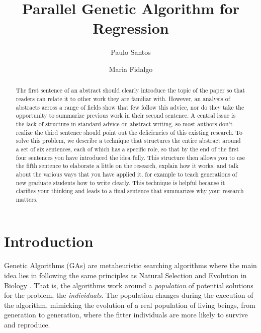 \documentclass[runningheads]{llncs}
\begin{document}
\title{Parallel Genetic Algorithm for Regression}

\author{Paulo Santos \and
Maria Fidalgo
}


\maketitle

\begin{abstract}
The first sentence of an abstract should clearly introduce the topic of the paper so that readers can relate it to other work they are familiar with. However, an analysis of abstracts across a range of fields show that few follow this advice, nor do they take the opportunity to summarize previous work in their second sentence. A central issue is the lack of structure in standard advice on abstract writing, so most authors don’t realize the third sentence should point out the deficiencies of this existing research. To solve this problem, we describe a technique that structures the entire abstract around a set of six sentences, each of which has a specific role, so that by the end of the first four sentences you have introduced the idea fully. This structure then allows you to use the fifth sentence to elaborate a little on the research, explain how it works, and talk about the various ways that you have applied it, for example to teach generations of new graduate students how to write clearly. This technique is helpful because it clarifies your thinking and leads to a final sentence that summarizes why your research matters.

\end{abstract}


\section{Introduction}

Genetic Algorithms (GAs) are metaheuristic searching algorithms where the main idea lies in following the same principles as Natural Selection and Evolution in Biology \cite{sivanandam2008genetic}. That is, the algorithms work around a \textit{population} of potential solutions for the problem, the \textit{individuals}. The population changes during the execution of the algorithm, mimicking the evolution of a real population of living beings, from generation to generation, where the fitter individuals are more likely to survive and reproduce.
\end{document}
